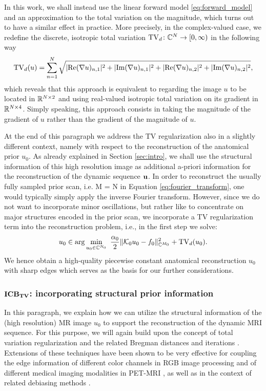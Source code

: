 In this work, we shall instead use the linear forward model \eqref{eq:forward_model} and an approximation to the total variation on the magnitude, which turns out to have a similar effect in practice. 
More precisely, in the complex-valued case, we redefine the discrete, isotropic total variation $\mathrm{TV}_d \colon \mathbb{C}^N \to [0,\infty)$ in the following way 
\begin{align*}
	\mathrm{TV}_d (u) = \sum_{n=1}^N \sqrt{|\mathrm{Re} (\nabla u)_{n,1}|^2 + |\mathrm{Im} (\nabla u)_{n,1}|^2 + |\mathrm{Re} (\nabla u)_{n,2}|^2 + |\mathrm{Im} (\nabla u)_{n,2}|^2},
\end{align*}
which reveals that this approach is equivalent to regarding the image $u$ to be located in $\mathbb{R}^{N \times 2}$ and using real-valued isotropic total variation on its gradient in $\mathbb{R}^{N \times 4}$.
Simply speaking, this approach consists in taking the magnitude of the gradient of $u$ rather than the gradient of the magnitude of $u$.

At the end of this paragraph we address the TV regularization also in a slightly different context, namely with respect to the reconstruction of the anatomical prior $u_0$. 
As already explained in Section \ref{sec:intro}, we shall use the structural information of this high resolution image as additional a-priori information for the reconstruction of the dynamic sequence $\mathbf{u}$.
In order to reconstruct the usually fully sampled prior scan, i.e. M = N in Equation \eqref{eq:fourier_transform}, one would typically simply apply the inverse Fourier transform. 
However, since we do not want to incorporate minor oscillations, but rather like to concentrate on major structures encoded in the prior scan, we incorporate a TV regularization term into the reconstruction problem, i.e., in the first step we solve:
\begin{equation*} \label{anatomicTV}
u_0 \in \arg \min_{u_0 \in \mathbb{C}^{N_0}} ~ \frac{\alpha_0}{2} \| \mathcal{K}_0 u_0 - f_0 \|_{\mathbb{C}^{M_0}}^2 + \mathrm{TV}_d(u_0).
\end{equation*}
We hence obtain a high-quality piecewise constant anatomical reconstruction $u_0$ with sharp edges which serves as the basis for our further considerations.

\subsubsection{$\boldsymbol{\mathrm{ICB}_{\mathrm{TV}}}$: incorporating structural prior information}
\label{subsubsec:structural prior}
In this paragraph, we explain how we can utilize the structural information of the (high resolution) MR image $u_0$ to support the reconstruction of the dynamic MRI sequence.
For this purpose, we will again build upon the concept of total variation regularization \cite{Rudin:ROF} and the related Bregman distances and iterations \cite{Osher:AnIterativeRegularizationMethod}. 
Extensions of these techniques have been shown to be very effective for coupling the edge information of different color channels in RGB image processing \cite{Moeller:ColorBregmanTV} and of different medical imaging modalities in PET-MRI \cite{Rasch2017}, as well as in the context of related debiasing methods \cite{2016debiasing}.

